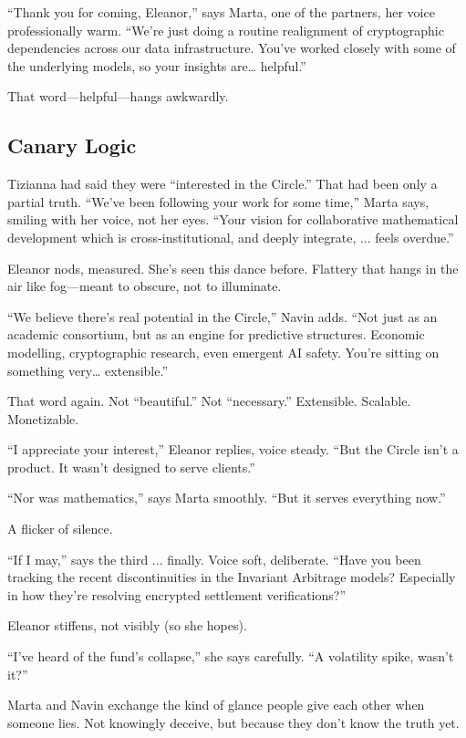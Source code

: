“Thank you for coming, Eleanor,” says Marta, one of the partners, her voice professionally warm. “We’re just doing a routine realignment of cryptographic dependencies across our data infrastructure. You’ve worked closely with some of the underlying models, so your insights are… helpful.”

That word—helpful—hangs awkwardly.

\subsection*{ Canary Logic}

Tizianna had said they were “interested in the Circle.”
That had been only a partial truth.
\smallskip
“We’ve been following your work for some time,” Marta says, smiling with her voice, not her eyes. “Your vision for collaborative mathematical development which is cross-institutional, and deeply integrate, ... feels overdue.”

Eleanor nods, measured.
She’s seen this dance before. Flattery that hangs in the air like fog—meant to obscure, not to illuminate.

“We believe there’s real potential in the Circle,” Navin adds. “Not just as an academic consortium, but as an engine for predictive structures. Economic modelling, cryptographic research, even emergent AI safety. You’re sitting on something very… extensible.”

That word again. Not “beautiful.” Not “necessary.”
Extensible.
Scalable.
Monetizable.

“I appreciate your interest,” Eleanor replies, voice steady. “But the Circle isn’t a product. It wasn’t designed to serve clients.”

“Nor was mathematics,” says Marta smoothly. “But it serves everything now.”

A flicker of silence.

“If I may,” says the third ... finally. Voice soft, deliberate. “Have you been tracking the recent discontinuities in the Invariant Arbitrage models? Especially in how they’re resolving encrypted settlement verifications?”

Eleanor stiffens, not visibly (so she hopes).

“I’ve heard of the fund’s collapse,” she says carefully. “A volatility spike, wasn’t it?”

Marta and Navin exchange the kind of glance people give each other when someone lies. Not knowingly deceive, but because they don’t know the truth yet.

